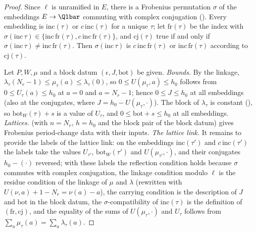 \begin{proof}
Since $\ell$ is unramified in $E$, there is a Frobenius permutation $\sigma$ of the embeddings $E\to\Qlbar$ commuting with complex
conjugation (). Every embedding is $\mathrm{inc}(\tau)$ or
$c\,\mathrm{inc}(\tau)$ for a unique $\tau$; let $\mathrm{fr}(\tau)$ be the index with $\sigma(\mathrm{inc}\,\tau)\in\{\mathrm{inc}\,\mathrm{fr}(\tau),
c\,\mathrm{inc}\,\mathrm{fr}(\tau)\}$, and $\mathrm{cj}(\tau)$ true if and only if $\sigma(\mathrm{inc}\,\tau)\ne\mathrm{inc}\,\mathrm{fr}(\tau)$.
Then $\sigma(\mathrm{inc}\,\tau)$ is $c\,\mathrm{inc}\,\mathrm{fr}(\tau)$ or $\mathrm{inc}\,\mathrm{fr}(\tau)$ according to $\mathrm{cj}(\tau)$.

Let $P,W,\mu$ and a block datum $(\epsilon,J,\mathrm{bot})$ be given. \emph{Bounds.} By the linkage, $\lambda_\tau(N_r-1)\le\mu_\tau(a)\le
\lambda_\tau(0)$, so $0\le U(\mu_\tau,a)\le h_0$ follows from $0\le U_\tau(a)\le h_0$ at $a=0$ and $a=N_r-1$; hence $0\le J\le h_0$ at all
embeddings (also at the conjugates, where $J=h_0-U(\mu_\tau,\cdot)$). The block of $\lambda_\tau$ is constant
(), so $\mathrm{bot}_W(\tau)+s$ is a value of $U_\tau$, and $0\le\mathrm{bot}+s\le h_0$ at all
embeddings. \emph{Lattices.}  (with $n=N_r$, $h=h_0$ and the block pair of the block datum) gives Frobenius
period-change data with their inputs. \emph{The lattice link.} It remains to provide the labels of the lattice link: on the embeddings
$\mathrm{inc}(\tau')$ and $c\,\mathrm{inc}(\tau')$ the labels take the values $U_{\tau'}$, $\mathrm{bot}_W(\tau')$ and $U(\mu_{\tau'},\cdot)$, and
their conjugates $h_0-(\cdot)$ reversed; with these labels the reflection condition holds because $\sigma$ commutes with complex
conjugation, the linkage condition modulo $\ell$ is the residue condition of the linkage of $\mu$ and $\lambda$ (rewritten with
$U(\nu,a)+1-N_r=\nu(a)-a$), the carrying condition is the description of $J$ and $\mathrm{bot}$ in the block datum, the
$\sigma$-compatibility of $\mathrm{inc}(\tau)$ is the definition of $(\mathrm{fr},\mathrm{cj})$, and the equality of the sums of $U(\mu_\tau,\cdot)$
and $U_\tau$ follows from $\sum_a\mu_\tau(a)=\sum_a\lambda_\tau(a)$.
\end{proof}

